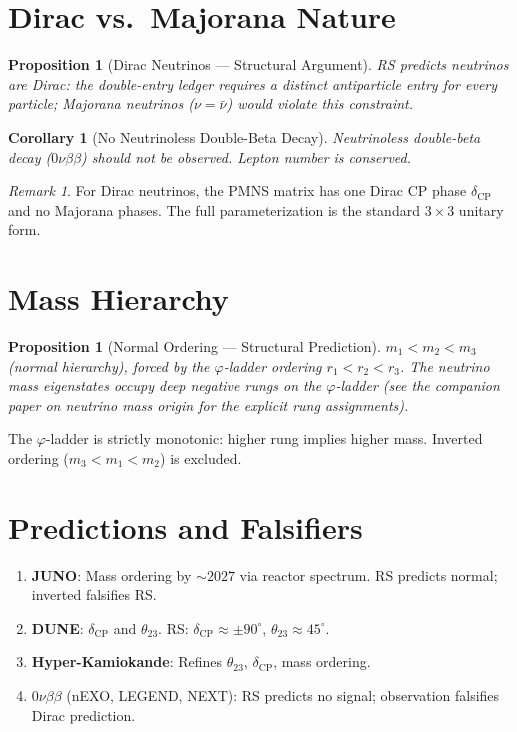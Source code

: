\documentclass[12pt,a4paper]{article}
\newtheorem{corollary}[theorem]{Corollary}
\newtheorem{proposition}[theorem]{Proposition}
\theoremstyle{definition}
\theoremstyle{remark}
\newtheorem{remark}[theorem]{Remark}
\begin{document}
\section{Dirac vs.\ Majorana Nature}
\label{sec:dirac-majorana}

\begin{proposition}[Dirac Neutrinos --- Structural Argument]
\label{thm:dirac}
RS predicts neutrinos are Dirac: the double-entry ledger requires a
distinct antiparticle entry for every particle; Majorana neutrinos
($\nu = \bar{\nu}$) would violate this constraint.
\end{proposition}

\begin{corollary}[No Neutrinoless Double-Beta Decay]
\label{cor:0nbb}
Neutrinoless double-beta decay ($0\nu\beta\beta$) should not be
observed.  Lepton number is conserved.
\end{corollary}

\begin{remark}
For Dirac neutrinos, the PMNS matrix has one Dirac CP phase
$\delta_{\mathrm{CP}}$ and no Majorana phases.  The full
parameterization is the standard $3 \times 3$ unitary form.
\end{remark}

\section{Mass Hierarchy}
\label{sec:hierarchy}

\begin{proposition}[Normal Ordering --- Structural Prediction]
\label{thm:normal}
$m_1 < m_2 < m_3$ (normal hierarchy), forced by the
$\varphi$-ladder ordering $r_1 < r_2 < r_3$.  The neutrino
mass eigenstates occupy deep negative rungs on the $\varphi$-ladder
(see the companion paper on neutrino mass origin for the explicit
rung assignments).
\end{proposition}

The $\varphi$-ladder is strictly monotonic: higher rung implies
higher mass.  Inverted ordering ($m_3 < m_1 < m_2$) is excluded.

\section{Predictions and Falsifiers}
\label{sec:predictions}

\begin{enumerate}[label=\textbf{(\arabic*)}]
  \item \textbf{JUNO}: Mass ordering by $\sim 2027$ via reactor
    spectrum.  RS predicts normal; inverted falsifies RS.
  \item \textbf{DUNE}: $\delta_{\mathrm{CP}}$ and $\theta_{23}$.
    RS: $\delta_{\mathrm{CP}} \approx \pm 90^\circ$, $\theta_{23}
    \approx 45^\circ$.
  \item \textbf{Hyper-Kamiokande}: Refines $\theta_{23}$,
    $\delta_{\mathrm{CP}}$, mass ordering.
  \item \textbf{$0\nu\beta\beta$} (nEXO, LEGEND, NEXT): RS predicts
    no signal; observation falsifies Dirac prediction.
\end{enumerate}
\end{document}
